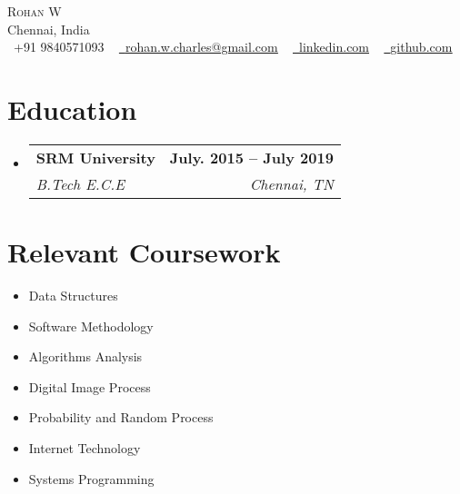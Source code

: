 \documentclass[letterpaper,10pt]{article}
\makeatletter
\newcommand{\resumeSubheading}[4]{
  \vspace{-2pt}\item
    \begin{tabular*}{1.0\textwidth}[t]{l@{\extracolsep{\fill}}r}
      \textbf{#1} & \textbf{\small #2} \\
      \textit{\small#3} & \textit{\small #4} \\
    \end{tabular*}\vspace{-7pt}
}
\newcommand{\resumeSubHeadingListStart}{\begin{itemize}[leftmargin=0.0in, label={}]}
\newcommand{\resumeSubHeadingListEnd}{\end{itemize}}
\makeatother
\begin{document}

\begin{center}
    {\Huge \scshape Rohan W} \\ \vspace{1pt}
    Chennai, India \\ \vspace{1pt}
    \small \raisebox{-0.1\height}\faPhone\ +91 9840571093 ~ \href{mailto:rohan.w.charles@gmail.com}{\raisebox{-0.2\height}\faEnvelope\  \underline{rohan.w.charles@gmail.com}} ~ 
    \href{https://linkedin.com/in/rohan-winsor-a80547161/}{\raisebox{-0.2\height}\faLinkedin\ \underline{linkedin.com}}  ~
    \href{https://github.com/ahnorr}{\raisebox{-0.2\height}\faGithub\ \underline{github.com}}
    \vspace{-8pt}
\end{center}


\section{Education}
  \resumeSubHeadingListStart
    \resumeSubheading
      {SRM University}{July. 2015 -- July 2019}
      {B.Tech E.C.E}{Chennai, TN}
  \resumeSubHeadingListEnd

\section{Relevant Coursework}
        \begin{multicols}{4}
            \begin{itemize}[itemsep=-5pt, parsep=3pt]
                \item\small Data Structures
                \item Software Methodology
                \item Algorithms Analysis
                \item Digital Image Process
                \item Probability and Random Process
                \item Internet Technology
                \item Systems Programming
            \end{itemize}
        \end{multicols}
        \vspace*{2.0\multicolsep}
\end{document}

